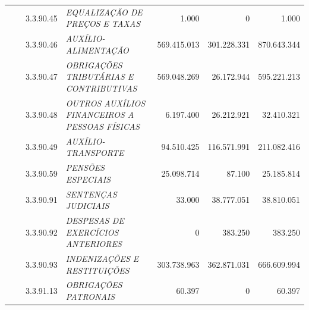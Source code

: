 \documentclass{article}
\begin{document}
\begin{longtable}[c]{m{0.1cm}m{0.1cm}m{0.8cm}|m{8cm}|m{2cm}|m{2cm}|m{2cm}}
\multicolumn{1}{l}{} & \multicolumn{1}{l}{} & \multicolumn{1}{l|}{3.3.90.45} & \multicolumn{1}{L{8cm}|}{\textit{EQUALIZAÇÃO DE PREÇOS E TAXAS}} & \multicolumn{1}{r|}{1.000} & \multicolumn{1}{r|}{             0} &  \multicolumn{1}{r}{1.000}\\
\multicolumn{1}{l}{} & \multicolumn{1}{l}{} & \multicolumn{1}{l|}{3.3.90.46} & \multicolumn{1}{L{8cm}|}{\textit{AUXÍLIO-ALIMENTAÇÃO}} & \multicolumn{1}{r|}{569.415.013} & \multicolumn{1}{r|}{301.228.331} &  \multicolumn{1}{r}{870.643.344}\\
\multicolumn{1}{l}{} & \multicolumn{1}{l}{} & \multicolumn{1}{l|}{3.3.90.47} & \multicolumn{1}{L{8cm}|}{\textit{OBRIGAÇÕES TRIBUTÁRIAS E CONTRIBUTIVAS}} & \multicolumn{1}{r|}{569.048.269} & \multicolumn{1}{r|}{26.172.944} &  \multicolumn{1}{r}{595.221.213}\\
\multicolumn{1}{l}{} & \multicolumn{1}{l}{} & \multicolumn{1}{l|}{3.3.90.48} & \multicolumn{1}{L{8cm}|}{\textit{OUTROS AUXÍLIOS FINANCEIROS A PESSOAS FÍSICAS}} & \multicolumn{1}{r|}{6.197.400} & \multicolumn{1}{r|}{26.212.921} &  \multicolumn{1}{r}{32.410.321}\\
\multicolumn{1}{l}{} & \multicolumn{1}{l}{} & \multicolumn{1}{l|}{3.3.90.49} & \multicolumn{1}{L{8cm}|}{\textit{AUXÍLIO-TRANSPORTE}} & \multicolumn{1}{r|}{94.510.425} & \multicolumn{1}{r|}{116.571.991} &  \multicolumn{1}{r}{211.082.416}\\
\multicolumn{1}{l}{} & \multicolumn{1}{l}{} & \multicolumn{1}{l|}{3.3.90.59} & \multicolumn{1}{L{8cm}|}{\textit{PENSÕES ESPECIAIS}} & \multicolumn{1}{r|}{25.098.714} & \multicolumn{1}{r|}{87.100} &  \multicolumn{1}{r}{25.185.814}\\
\multicolumn{1}{l}{} & \multicolumn{1}{l}{} & \multicolumn{1}{l|}{3.3.90.91} & \multicolumn{1}{L{8cm}|}{\textit{SENTENÇAS JUDICIAIS}} & \multicolumn{1}{r|}{33.000} & \multicolumn{1}{r|}{38.777.051} &  \multicolumn{1}{r}{38.810.051}\\
\multicolumn{1}{l}{} & \multicolumn{1}{l}{} & \multicolumn{1}{l|}{3.3.90.92} & \multicolumn{1}{L{8cm}|}{\textit{DESPESAS DE EXERCÍCIOS ANTERIORES}} & \multicolumn{1}{r|}{             0} & \multicolumn{1}{r|}{383.250} &  \multicolumn{1}{r}{383.250}\\
\multicolumn{1}{l}{} & \multicolumn{1}{l}{} & \multicolumn{1}{l|}{3.3.90.93} & \multicolumn{1}{L{8cm}|}{\textit{INDENIZAÇÕES E RESTITUIÇÕES}} & \multicolumn{1}{r|}{303.738.963} & \multicolumn{1}{r|}{362.871.031} &  \multicolumn{1}{r}{666.609.994}\\
\multicolumn{1}{l}{} & \multicolumn{1}{l}{} & \multicolumn{1}{l|}{3.3.91.13} & \multicolumn{1}{L{8cm}|}{\textit{OBRIGAÇÕES PATRONAIS}} & \multicolumn{1}{r|}{60.397} & \multicolumn{1}{r|}{             0} &  \multicolumn{1}{r}{60.397}\\

\end{longtable}
\end{document}
